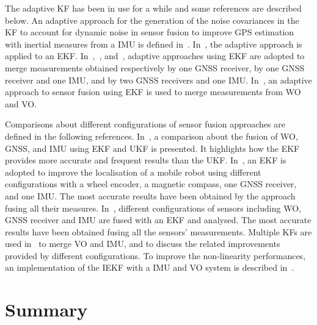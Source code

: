 The adaptive \gls{KF} has been in use for a while and some references are described below.
An adaptive approach for the generation of the noise covariances in the \gls{KF} to account for dynamic noise in sensor fusion to improve \gls{GPS} estimation with inertial measures from a \gls{IMU} is defined in~\cite{mohamed1999adaptive}.
In~\cite{grandoni_sensor_2001}, the adaptive approach is applied to an \gls{EKF}.
In~\cite{kong_using_2012},~\cite{Werries-2016-5519}, and~\cite{hao_modified_2018}, adaptive approaches using \gls{EKF} are adopted to merge measurements obtained respectively by one \gls{GNSS} receiver, by one \gls{GNSS} receiver and one \gls{IMU}, and by two \gls{GNSS} receivers and one \gls{IMU}.
In~\cite{chenavier_position_1992}, an adaptive approach to sensor fusion using \gls{EKF} is used to merge measurements from \gls{WO} and \gls{VO}.


Comparisons about different configurations of sensor fusion approaches are defined in the following references.
In~\cite{amador_robot_2019}, a comparison about the fusion of \gls{WO}, \gls{GNSS}, and \gls{IMU} using \gls{EKF} and \gls{UKF} is presented. It highlights how the \gls{EKF} provides more accurate and frequent results than the \gls{UKF}.
In~\cite{7373480}, an \gls{EKF} is adopted to improve the localisation of a mobile robot using different configurations with a wheel encoder, a magnetic compass, one \gls{GNSS} receiver, and one \gls{IMU}. The most accurate results have been obtained by the approach fusing all their measures.
In~\cite{8696103}, different configurations of sensors including \gls{WO}, \gls{GNSS} receiver and \gls{IMU} are fused with an \gls{EKF} and analysed. The most accurate results have been obtained fusing all the sensors' measurements.
Multiple \glspl{KF} are used in~\cite{liu2016stereo} to merge \gls{VO} and \gls{IMU}, and to discuss the related improvements provided by different configurations.
To improve the non-linearity performances, an implementation of the \gls{IEKF} with a \gls{IMU} and \gls{VO} system is described in~\cite{bloesch2017iterated}.


\section{Summary}

